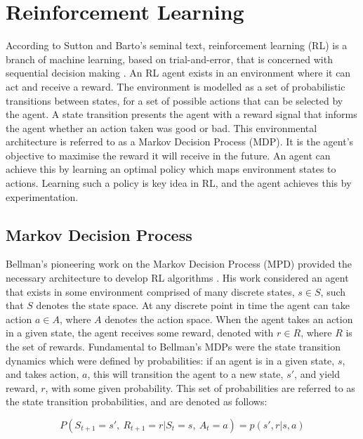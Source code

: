 \section{Reinforcement Learning}\label{rl}
According to Sutton and Barto's seminal text, reinforcement learning (RL) is a branch of machine learning, based on trial-and-error, that is concerned with sequential decision making \cite{Sutton2018}. An RL agent exists in an environment where it can act and receive a reward. The environment is modelled as a set of probabilistic transitions between states, for a set of possible actions that can be selected by the agent. A state transition presents the agent with a reward signal that informs the agent whether an action taken was good or bad. This environmental architecture is referred to as a Markov Decision Process (MDP). It is the agent's objective to maximise the reward it will receive in the future. An agent can achieve this by learning an optimal policy which maps environment states to actions. Learning such a policy is key idea in RL, and the agent achieves this by experimentation.


\subsection{Markov Decision Process}
Bellman's pioneering work on the Markov Decision Process (MPD) provided the necessary architecture to develop RL algorithms \cite{Bellm1957}. His work considered an agent that exists in some environment comprised of many discrete states, $s \in S$, such that $S$ denotes the state space. At any discrete point in time the agent can take action $a \in A$, where $A$ denotes the action space. When the agent takes an action in a given state, the agent receives some reward, denoted with $r \in R$, where $R$ is the set of rewards. Fundamental to Bellman's MDPs were the state transition dynamics which were defined by probabilities: if an agent is in a given state, $s$, and takes action, $a$, this will transition the agent to a new state, $s'$, and yield reward, $r$, with some given probability. This set of probabilities are referred to as the state transition probabilities, and are denoted as follows:

\begin{equation}
	P(S_{t+1} = s', \ R_{t+1} = r | S_t = s, \ A_t = a) = p(s', r | s, a) \label{eq:21}
\end{equation}

